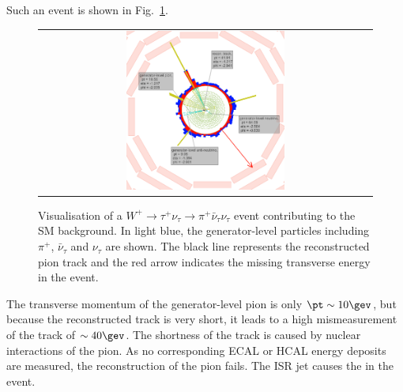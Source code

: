 Such an event is shown in Fig.~\ref{fig:LostTau}.  
\begin{figure}[!tb]
  \centering 
  \begin{tabular}{c}
    \includegraphics[width=0.49\textwidth]{figures/analysis/Background/LostTau_lumi_20940_event_8369426.png}
  \end{tabular}
  \caption{Visualisation of a $W^{+}\rightarrow \tau^{+}\nu_{\tau} \rightarrow \pi^{+}\bar{\nu}_{\tau} \nu_{\tau} $ event contributing to the SM background. 
           In light blue, the generator-level particles including $\pi^{+}$, $\bar{\nu}_{\tau}$ and $\nu_{\tau}$ are shown.
           The black line represents the reconstructed pion track and the red arrow indicates the missing transverse energy in the event.}
  \label{fig:LostTau}
\end{figure}
The transverse momentum of the generator-level pion is only $\pt\sim10\gev$, but because the reconstructed track is very short, it leads to a high mismeasurement of the track \pt of $\sim40\gev$.
The shortness of the track is caused by nuclear interactions of the pion.
As no corresponding ECAL or HCAL energy deposits are measured, the reconstruction of the pion fails.
The ISR jet causes the \met in the event.

